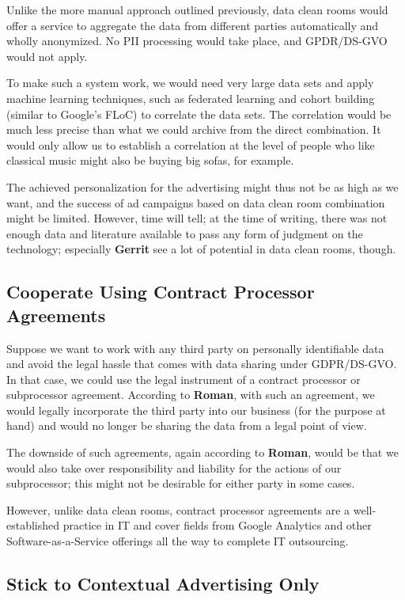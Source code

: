 Unlike the more manual approach outlined previously, data clean rooms would offer a service to aggregate the data from different parties automatically and wholly anonymized. No PII processing would take place, and GPDR/DS-GVO would not apply.

To make such a system work, we would need very large data sets and apply machine learning techniques, such as federated learning and cohort building (similar to Google's FLoC) to correlate the data sets. The correlation would be much less precise than what we could archive from the direct combination. It would only allow us to establish a correlation at the level of people who like classical music might also be buying big sofas, for example.

The achieved personalization for the advertising might thus not be as high as we want, and the success of ad campaigns based on data clean room combination might be limited. However, time will tell; at the time of writing, there was not enough data and literature available to pass any form of judgment on the technology; especially \textbf{Gerrit} see a lot of potential in data clean rooms, though.

\subsection{Cooperate Using Contract Processor Agreements}

Suppose we want to work with any third party on personally identifiable data and avoid the legal hassle that comes with data sharing under GDPR/DS-GVO. In that case, we could use the legal instrument of a contract processor or subprocessor agreement. According to \textbf{Roman}, with such an agreement, we would legally incorporate the third party into our business (for the purpose at hand) and would no longer be sharing the data from a legal point of view.

The downside of such agreements, again according to \textbf{Roman}, would be that we would also take over responsibility and liability for the actions of our subprocessor; this might not be desirable for either party in some cases.

However, unlike data clean rooms, contract processor agreements are a well-established practice in IT and cover fields from Google Analytics and other Software-as-a-Service offerings all the way to complete IT outsourcing.

\subsection{Stick to Contextual Advertising Only}

